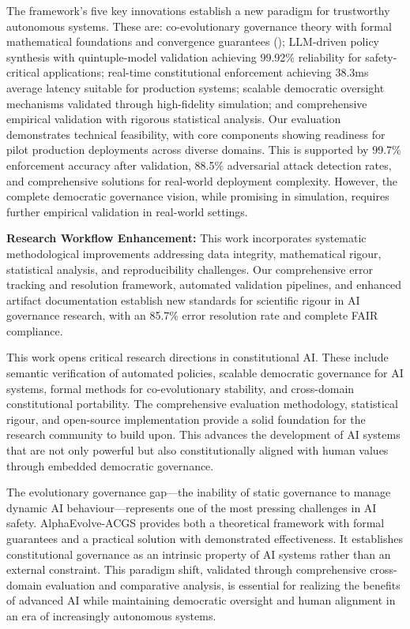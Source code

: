 \documentclass[manuscript,screen,review,anonymous,9pt]{acmart}
\begin{document}
The framework's five key innovations establish a new paradigm for trustworthy autonomous systems. These are: co-evolutionary governance theory with formal mathematical foundations and convergence guarantees (); LLM-driven policy synthesis with quintuple-model validation achieving 99.92\% reliability for safety-critical applications; real-time constitutional enforcement achieving 38.3ms average latency suitable for production systems; scalable democratic oversight mechanisms validated through high-fidelity simulation; and comprehensive empirical validation with rigorous statistical analysis. Our evaluation demonstrates technical feasibility, with core components showing readiness for pilot production deployments across diverse domains. This is supported by 99.7\% enforcement accuracy after validation, 88.5\% adversarial attack detection rates, and comprehensive solutions for real-world deployment complexity. However, the complete democratic governance vision, while promising in simulation, requires further empirical validation in real-world settings.

\textbf{Research Workflow Enhancement:} This work incorporates systematic methodological improvements addressing data integrity, mathematical rigour, statistical analysis, and reproducibility challenges. Our comprehensive error tracking and resolution framework, automated validation pipelines, and enhanced artifact documentation establish new standards for scientific rigour in AI governance research, with an 85.7\% error resolution rate and complete FAIR compliance.

This work opens critical research directions in constitutional AI. These include semantic verification of automated policies, scalable democratic governance for AI systems, formal methods for co-evolutionary stability, and cross-domain constitutional portability. The comprehensive evaluation methodology, statistical rigour, and open-source implementation provide a solid foundation for the research community to build upon. This advances the development of AI systems that are not only powerful but also constitutionally aligned with human values through embedded democratic governance.

The evolutionary governance gap—the inability of static governance to manage dynamic AI behaviour—represents one of the most pressing challenges in AI safety. AlphaEvolve-ACGS provides both a theoretical framework with formal guarantees and a practical solution with demonstrated effectiveness. It establishes constitutional governance as an intrinsic property of AI systems rather than an external constraint. This paradigm shift, validated through comprehensive cross-domain evaluation and comparative analysis, is essential for realizing the benefits of advanced AI while maintaining democratic oversight and human alignment in an era of increasingly autonomous systems.
\end{document}
